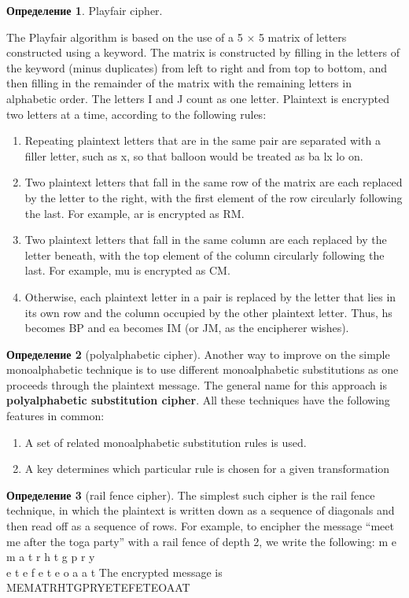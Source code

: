 \documentclass[a4paper]{article}
\theoremstyle{definition}
\newtheorem*{definition}{Определение}
\theoremstyle{remark}
\begin{document}
\begin{definition}
    Playfair cipher.

    The Playfair algorithm is based on the use of a 5 × 5 matrix of letters constructed using a keyword.
    The matrix is constructed by filling in
the letters of the keyword (minus duplicates) from left to right and from top to bottom, and then filling in the remainder of the matrix with the remaining letters in
alphabetic order. The letters I and J count as one letter. Plaintext is encrypted two
letters at a time, according to the following rules:
\begin{enumerate}
    \item Repeating plaintext letters that are in the same pair are separated with a filler
    letter, such as x, so that balloon would be treated as ba lx lo on.
    \item Two plaintext letters that fall in the same row of the matrix are each replaced by
    the letter to the right, with the first element of the row circularly following the
    last. For example, ar is encrypted as RM.
    \item Two plaintext letters that fall in the same column are each replaced by the letter
    beneath, with the top element of the column circularly following the last. For
    example, mu is encrypted as CM.
    \item Otherwise, each plaintext letter in a pair is replaced by the letter that lies in its
    own row and the column occupied by the other plaintext letter. Thus, hs
    becomes BP and ea becomes IM (or JM, as the encipherer wishes).
\end{enumerate}
\end{definition}

\begin{definition}[polyalphabetic cipher]
    Another way to improve on the simple monoalphabetic technique is to use different
monoalphabetic substitutions as one proceeds through the plaintext message. The
general name for this approach is \textbf{polyalphabetic substitution cipher}. All these techniques have the following features in common:
\begin{enumerate}
    \item A set of related monoalphabetic substitution rules is used.
    \item A key determines which particular rule is chosen for a given transformation
\end{enumerate} 
\end{definition}
\begin{definition}[rail fence cipher]
    The simplest such cipher is the rail fence technique, in which the plaintext is
written down as a sequence of diagonals and then read off as a sequence of rows. For
example, to encipher the message “meet me after the toga party” with a rail fence of
depth 2, we write the following:
m e m a t r h t g p r y\\
 e t e f e t e o a a t
The encrypted message is \\ 
MEMATRHTGPRYETEFETEOAAT
\end{definition}
\end{document}
